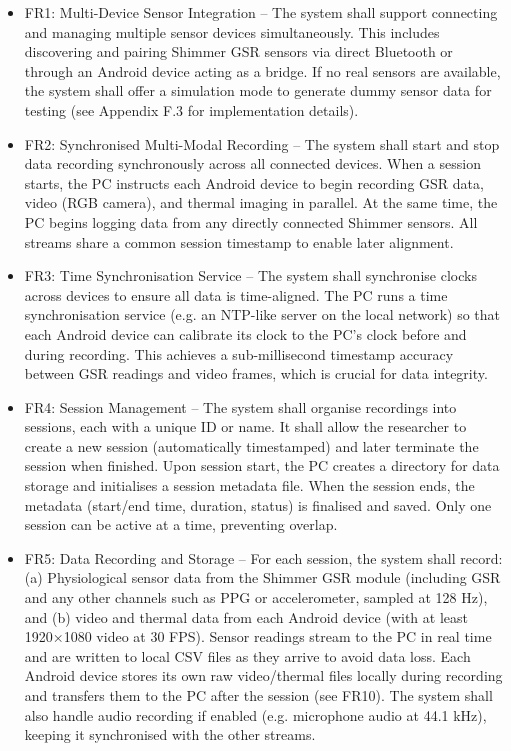 \begin{itemize}
    \item FR1: Multi-Device Sensor Integration -- The system shall support connecting and managing multiple sensor devices simultaneously. This includes discovering and pairing Shimmer GSR sensors via direct Bluetooth or through an Android device acting as a bridge. If no real sensors are available, the system shall offer a simulation mode to generate dummy sensor data for testing (see Appendix F.3 for implementation details).

    \item FR2: Synchronised Multi-Modal Recording -- The system shall start and stop data recording synchronously across all connected devices. When a session starts, the PC instructs each Android device to begin recording GSR data, video (RGB camera), and thermal imaging in parallel. At the same time, the PC begins logging data from any directly connected Shimmer sensors. All streams share a common session timestamp to enable later alignment.

    \item FR3: Time Synchronisation Service -- The system shall synchronise clocks across devices to ensure all data is time-aligned. The PC runs a time synchronisation service (e.g. an NTP-like server on the local network) so that each Android device can calibrate its clock to the PC's clock before and during recording. This achieves a sub-millisecond timestamp accuracy between GSR readings and video frames, which is crucial for data integrity.

    \item FR4: Session Management -- The system shall organise recordings into sessions, each with a unique ID or name. It shall allow the researcher to create a new session (automatically timestamped) and later terminate the session when finished. Upon session start, the PC creates a directory for data storage and initialises a session metadata file. When the session ends, the metadata (start/end time, duration, status) is finalised and saved. Only one session can be active at a time, preventing overlap.

    \item FR5: Data Recording and Storage -- For each session, the system shall record: (a) Physiological sensor data from the Shimmer GSR module (including GSR and any other channels such as PPG or accelerometer, sampled at 128 Hz), and (b) video and thermal data from each Android device (with at least 1920×1080 video at 30 FPS). Sensor readings stream to the PC in real time and are written to local CSV files as they arrive to avoid data loss. Each Android device stores its own raw video/thermal files locally during recording and transfers them to the PC after the session (see FR10). The system shall also handle audio recording if enabled (e.g. microphone audio at 44.1 kHz), keeping it synchronised with the other streams.


\end{itemize}
